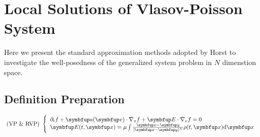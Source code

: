 
\newcommand{\rhoabs}{\hyperref[eq:rhoabs-control]{($\rho_{abs}$ control condition)~}}
\newcommand{\supremumf}{\hyperref[eq:supremum-f0-control]{($\sup f_{0}$ control condition)~}}
\newcommand{\lipxOfrho}{\hyperref[eq:lipx_rho_control]{($\operatorname{lip}_x(\rho)$ control condition)~}}
\newcommand{\lipOffVsphere}{\hyperref[eq:lip_Of_f0_in_vsphere_control]{($\operatorname{lip}(f_0)$ in $v$ sphere control condition)~}}



\chapter{Local Solutions of Vlasov-Poisson System}

Here we present the standard approximation methods adopted by Horst to investigate the well-posedness of the generalized \eqvp system problem in $N$ dimenstion space. %
\section{Definition Preparation}
\begin{equation}
    \label{eq:vp_ndim}
    \text { (VP \& RVP) }\left\{\begin{array}{l}
    \partial_{t} f+\vect{a}(\vv ) \cdot \nabla_{x} f+\vE \cdot \nabla_{v} f=0 \\
    \vE(t, \vx)=\mu\int \frac{\vx - \vect{y}}{|\vx - \vect{y}|^N} \rho(t,\vx) \mathrm{d} \vx %
\end{array}\right.\end{equation}



